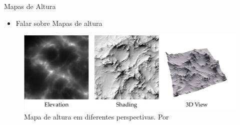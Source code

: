 \begin{frame}{Mapas de Altura}
    \begin{itemize}\setlength\itemsep{1em}
        \item Falar sobre Mapas de altura    
    \end{itemize}
    \begin{figure}[H]
        \centering
        \includegraphics[width=.75\textwidth]{img/hmap}
        \caption{Mapa de altura em diferentes perspectivas. Por \cite{dachsbacher2006interactive}}
        \label{fig:hmap}
    \end{figure}
\end{frame}